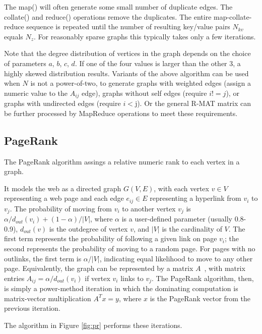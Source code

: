 The map() will often generate some small number of duplicate edges.
The collate() and reduce() operations remove the duplicates.  The
entire map-collate-reduce sequence is repeated until the number of
resulting key/value pairs $N_{kv}$ equals $N_z$.  For reasonably
sparse graphs this typically takes only a few iterations.

Note that the degree distribution of vertices in the graph depends on
the choice of parameters $a$, $b$, $c$, $d$.  If one of the four
values is larger than the other 3, a highly skewed distribution
results.  Variants of the above algorithm can be used when $N$ is not
a power-of-two, to generate graphs with weighted edges (assign a
numeric value to the $A_{ij}$ edge), graphs without self edges
(require $i != j$), or graphs with undirected edges (require $i < $j).
Or the general R-MAT matrix can be further processed by MapReduce
operations to meet these requirements.

\subsection{PageRank}

The PageRank algorithm assings a relative numeric rank to each
vertex in a graph.

It models the web as a directed graph $G(V,E)$, with each vertex $v
\in V$ representing a web page and each edge $e_{ij} \in E$
representing a hyperlink from $v_i$ to $v_j$.  The probability of
moving from $v_i$ to another vertex $v_j$ is $\alpha/d_{out}(v_i) +
(1-\alpha)/|V|$, where $\alpha$ is a user-defined parameter (usually
0.8-0.9), $d_{out}(v)$ is the outdegree of vertex $v$, and $|V|$ is
the cardinality of $V$.  The first term represents the probability of
following a given link on page $v_i$; the second represents the
probability of moving to a random page.  For pages with no outlinks,
the first term is $\alpha/|V|$, indicating equal likelihood to move to
any other page.  Equivalently, the graph can be represented by a
matrix $A$~\cite{LangvilleMeyer05a}, with matrix entries $A_{ij} =
\alpha/d_{out}(v_i)$ if vertex $v_i$ links to $v_j$.  The PageRank
algorithm, then, is simply a power-method iteration in which the
dominating computation is matrix-vector multiplication $A^T x=y$,
where $x$ is the PageRank vector from the previous iteration.

The algorithm in Figure \ref{fig:pr} performs these
iterations.


